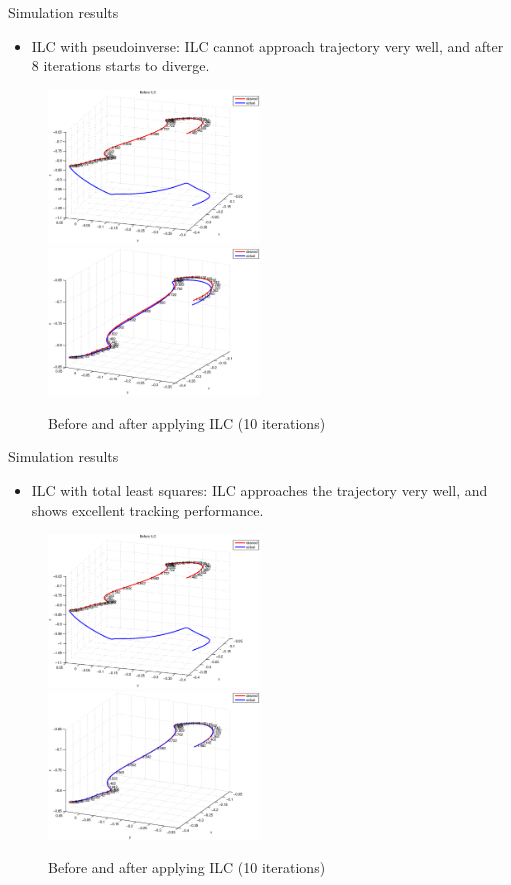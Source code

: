 \documentclass[handout]{beamer}
\begin{document}
\begin{frame}{Simulation results}
\begin{itemize}
\item ILC with pseudoinverse: ILC cannot approach trajectory very well, and after 8 iterations starts to diverge.
\end{itemize}
\begin{figure}
\centering
\includegraphics[width=0.5\textwidth]{beforeILC.eps}%
\includegraphics[width=0.5\textwidth]{afterILCPseudoInv.eps}		
\caption{Before and after applying ILC (10 iterations)}
\end{figure}
\end{frame}
%
\begin{frame}{Simulation results}
\begin{itemize}
\item ILC with total least squares: ILC approaches the trajectory very well, and shows excellent tracking performance.
\end{itemize}
\begin{figure}
\centering
\includegraphics[width=0.5\textwidth]{beforeILC.eps}%
\includegraphics[width=0.5\textwidth]{afterILCTLS.eps}		
\caption{Before and after applying ILC (10 iterations)}
\end{figure}
\end{frame}
\end{document}
